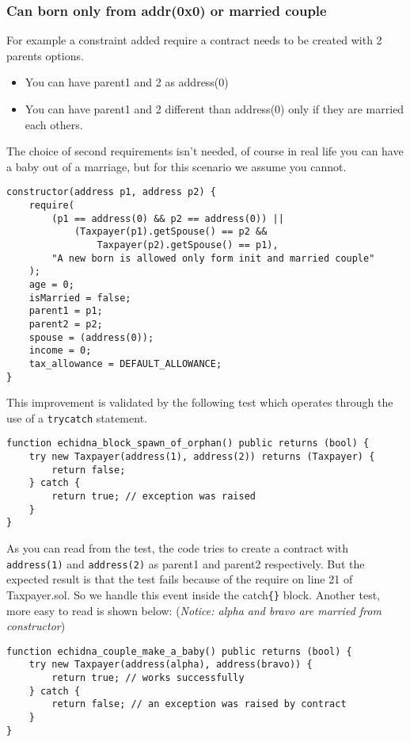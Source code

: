 \documentclass{article}
\begin{document}
\subsubsection{Can born only from addr(0x0) or married couple}
For example a constraint added require a contract needs to be created with 2 parents options.
\begin{itemize}
    \small
    \item You can have parent1 and 2 as address(0)
    \item You can have parent1 and 2 different than address(0) only if they are married each others.
\end{itemize}
The choice of second requirements isn't needed, of course in real life you can have a baby out of a marriage, but for this scenario we assume you cannot.
\begin{verbatim}
constructor(address p1, address p2) {
    require(
        (p1 == address(0) && p2 == address(0)) ||
            (Taxpayer(p1).getSpouse() == p2 &&
                Taxpayer(p2).getSpouse() == p1),
        "A new born is allowed only form init and married couple"
    );
    age = 0;
    isMarried = false;
    parent1 = p1;
    parent2 = p2;
    spouse = (address(0));
    income = 0;
    tax_allowance = DEFAULT_ALLOWANCE;
}
\end{verbatim}
This improvement is validated by the following test which operates through the use of a \texttt{try{}catch{}} statement.
\begin{verbatim}
function echidna_block_spawn_of_orphan() public returns (bool) {
    try new Taxpayer(address(1), address(2)) returns (Taxpayer) {
        return false;
    } catch {
        return true; // exception was raised
    }
}
\end{verbatim}
As you can read from the test, the code tries to create a contract with \texttt{address(1)} and \texttt{address(2)} as parent1 and parent2 respectively. But the expected result is that the test fails because of the require on line 21 of Taxpayer.sol. So we handle this event inside the catch\verb|{}| block.
Another test, more easy to read is shown below: (\textit{Notice: alpha and bravo are married from constructor})
\begin{verbatim}
function echidna_couple_make_a_baby() public returns (bool) {
    try new Taxpayer(address(alpha), address(bravo)) {
        return true; // works successfully
    } catch {
        return false; // an exception was raised by contract
    }
}
\end{verbatim}
\end{document}

